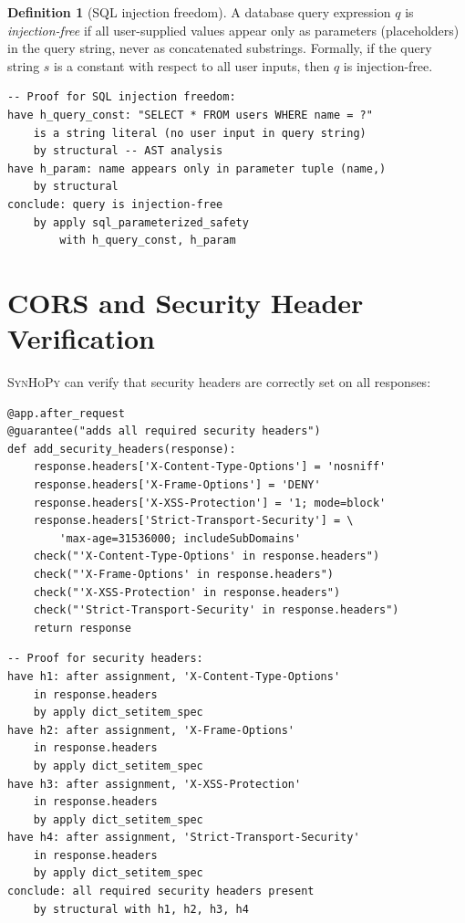\documentclass[11pt,a4paper]{report}
\theoremstyle{definition}
\newtheorem{definition}{Definition}[chapter]
\theoremstyle{plain}
\newcommand{\synhopy}{\textsc{SynHoPy}}
\begin{document}
\begin{definition}[SQL injection freedom]
A database query expression $q$ is \emph{injection-free} if all
user-supplied values appear only as parameters (placeholders) in the query
string, never as concatenated substrings.  Formally, if the query string
$s$ is a constant with respect to all user inputs, then $q$ is
injection-free.
\end{definition}

\begin{lstlisting}[style=proof]
-- Proof for SQL injection freedom:
have h_query_const: "SELECT * FROM users WHERE name = ?"
    is a string literal (no user input in query string)
    by structural -- AST analysis
have h_param: name appears only in parameter tuple (name,)
    by structural
conclude: query is injection-free
    by apply sql_parameterized_safety
        with h_query_const, h_param
\end{lstlisting}

\section{CORS and Security Header Verification}

\synhopy{} can verify that security headers are correctly set on all
responses:

\begin{lstlisting}[style=synhopy]
@app.after_request
@guarantee("adds all required security headers")
def add_security_headers(response):
    response.headers['X-Content-Type-Options'] = 'nosniff'
    response.headers['X-Frame-Options'] = 'DENY'
    response.headers['X-XSS-Protection'] = '1; mode=block'
    response.headers['Strict-Transport-Security'] = \
        'max-age=31536000; includeSubDomains'
    check("'X-Content-Type-Options' in response.headers")
    check("'X-Frame-Options' in response.headers")
    check("'X-XSS-Protection' in response.headers")
    check("'Strict-Transport-Security' in response.headers")
    return response
\end{lstlisting}

\begin{lstlisting}[style=proof]
-- Proof for security headers:
have h1: after assignment, 'X-Content-Type-Options'
    in response.headers
    by apply dict_setitem_spec
have h2: after assignment, 'X-Frame-Options'
    in response.headers
    by apply dict_setitem_spec
have h3: after assignment, 'X-XSS-Protection'
    in response.headers
    by apply dict_setitem_spec
have h4: after assignment, 'Strict-Transport-Security'
    in response.headers
    by apply dict_setitem_spec
conclude: all required security headers present
    by structural with h1, h2, h3, h4
\end{lstlisting}
\end{document}
